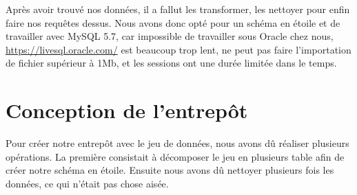 \documentclass[11pt, a4paper]{article}
\newcommand\tab{\hspace*{12.5mm}}
\begin{document}
Après avoir trouvé nos données, il a fallut les transformer, les nettoyer pour enfin faire nos requêtes dessus. Nous avons donc opté pour un schéma en étoile et de travailler avec MySQL 5.7, car impossible de travailler sous Oracle chez nous, \url{https://livesql.oracle.com/} est beaucoup trop lent, ne peut pas faire l'importation de fichier supérieur à 1Mb, et les sessions ont une durée limitée dans le temps.

\section{Conception de l'entrepôt}
\tab Pour créer notre entrepôt avec le jeu de données, nous avons dû réaliser plusieurs opérations. La première consistait à décomposer le jeu en plusieurs table afin de créer notre schéma en étoile. Ensuite nous avons dû nettoyer plusieurs fois les données, ce qui n'était pas chose aisée.
\end{document}

